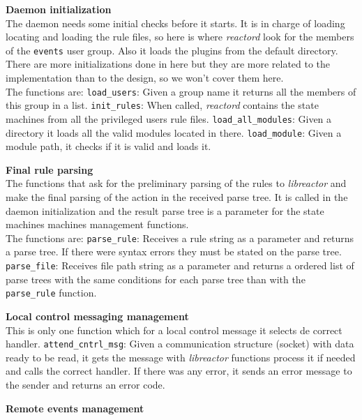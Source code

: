 \begin{list}{-}{The functionalities in this class are:}
  \item {\bf Daemon initialization}\\
    The daemon needs some initial checks before it starts. It is in charge of loading locating and loading the rule files, so here is where
    \emph{reactord} look for the members of the \texttt{events} user group. Also it loads the plugins from the default directory. There are
    more initializations done in here but they are more related to the implementation than to the design, so we won't cover them here.\\
    The functions are:
    \subitem \texttt{load\_users}:
      Given a group name it returns all the members of this group in a list.
    \subitem \texttt{init\_rules}:
      When called, \emph{reactord} contains the state machines from all the privileged users rule files.
    \subitem \texttt{load\_all\_modules}:
      Given a directory it loads all the valid modules located in there.
    \subitem \texttt{load\_module}:
      Given a module path, it checks if it is valid and loads it.
  \item {\bf Final rule parsing}\\
    The functions that ask for the preliminary parsing of the rules to \emph{libreactor} and make the final parsing of the action in the
    received parse tree. It is called in the daemon initialization and the result parse tree is a parameter for the state machines 
    machines management functions.\\
    The functions are:
    \subitem \texttt{parse\_rule}:
      Receives a rule string as a parameter and returns a parse tree. If there were syntax errors they must be stated on the parse tree.
    \subitem \texttt{parse\_file}:
      Receives file path string as a parameter and returns a ordered list of parse trees with the same conditions for each parse tree than
      with the \texttt{parse\_rule} function.
  \item {\bf Local control messaging management}\\
    This is only one function which for a local control message it selects de correct handler.
    \subitem \texttt{attend\_cntrl\_msg}:
      Given a communication structure (socket) with data ready to be read, it gets the message with \emph{libreactor} functions process
      it if needed and calls the correct handler. If there was any error, it sends an error message to the sender and returns an error
      code.
  \item {\bf Remote events management}\\

\end{list}
